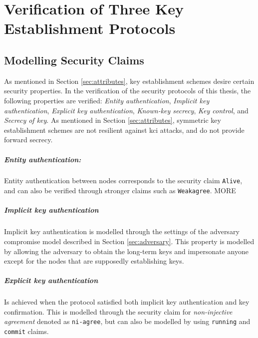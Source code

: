 \chapter{Verification of Three Key Establishment Protocols}
\label{chp:analysis}


\section{Modelling Security Claims}

As mentioned in Section \ref{sec:attributes}, key establishment schemes desire certain security properties. In the verification of the security protocols of this thesis, the following properties are verified: \emph{Entity authentication}, \emph{Implicit key authentication}, \emph{Explicit key authentication}, \emph{Known-key secrecy}, \emph{Key control}, and \emph{Secrecy of key}. As mentioned in Section \ref{sec:attributes}, symmetric key establishment schemes are not resilient against \gls{kci} attacks, and do not provide forward secrecy. %

\paragraph{Entity authentication:} Entity authentication between nodes corresponds to the security claim \texttt{Alive}, and can also be verified through stronger claims such as \texttt{Weakagree}. MORE %

\paragraph{Implicit key authentication} Implicit key authentication is modelled through the settings of the adversary compromise model described in Section \ref{sec:adversary}. This property is modelled by allowing the adversary to obtain the long-term keys and impersonate anyone except for the nodes that are supposedly establishing keys.

\paragraph{Explicit key authentication} Is achieved when the protocol satisfied both implicit key authentication and key confirmation. This is modelled through the security claim for \emph{non-injective agreement} denoted as \texttt{ni-agree}, but can also be modelled by using \texttt{running} and \texttt{commit} claims.

